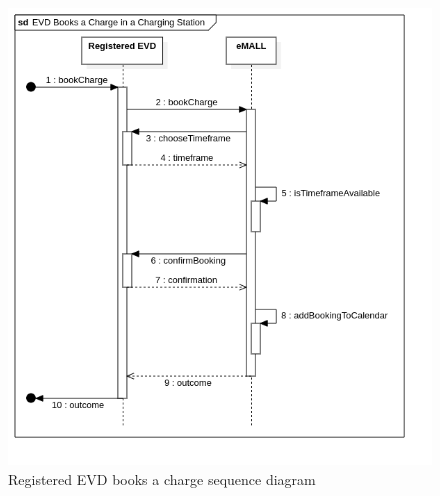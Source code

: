 \begin{center}
    \begin{figure} [H]
        \begin{center}
            \includegraphics[width=0.9\linewidth]{Images/SequenceDiagrams/evd_books_a_charge_in_charging_station}
            \caption{Registered EVD books a charge sequence diagram}
            \label{fig: evd_books_charge_seq_diag}
        \end{center}
    \end{figure}
\end{center}

\newpage

